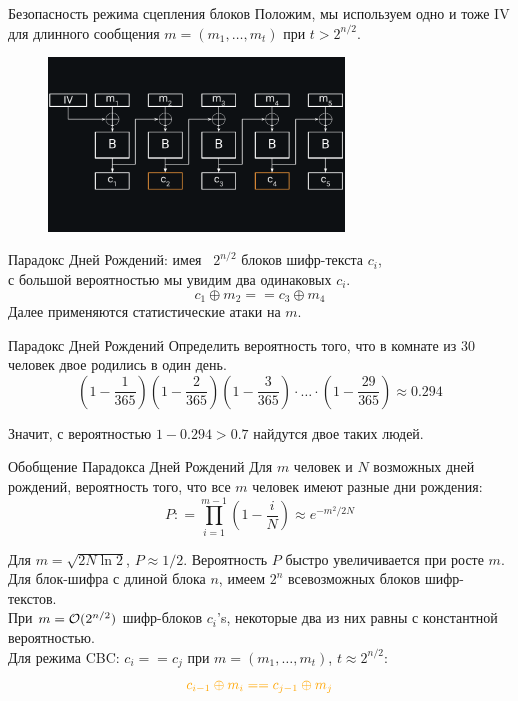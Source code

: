 \documentclass[usenames,dvipsnames,8pt,aspectratio=169]{beamer}
\begin{document}
\begin{frame}{Безопасность режима сцепления блоков}
\Large
Положим, мы используем одно и тоже IV для длинного сообщения $m=(m_1, \ldots, m_t)$ при $t> 2^{n/2}$.
\vspace{-2pt}
\begin{figure}
\includegraphics[width=0.7\textwidth]{CBC_1}
\end{figure}
\vspace{-35pt}
{\color{Orange}Парадокс Дней Рождений:} имея ~$2^{n/2}$ блоков шифр-текста $c_i$, \\ с большой вероятностью мы увидим два одинаковых $c_i$.
\Large
\[
c_1 \oplus m_2 == c_3 \oplus m_4
\]
Далее применяются статистические атаки на $m$.
\end{frame}

\begin{frame}{Парадокс Дней Рождений}
\Large
{\color{Orange} Определить вероятность того, что в комнате из 30 человек двое родились в один день.}\\
\pause
\vspace{30pt}
\[
\left(1 - \frac{1}{365}\right)  \left(1 - \frac{2}{365}\right) \left(1 - \frac{3}{365}\right) \cdot \ldots \cdot \left(1 - \frac{29}{365}\right)  \approx 0.294
\]

\vspace{30pt}
Значит, с вероятностью $1-0.294>0.7$ найдутся двое таких людей.

\end{frame}

\begin{frame}{Обобщение Парадокса Дней Рождений}
\Large
Для $m$ человек и $N$ возможных дней рождений, вероятность того, что все $m$ человек имеют разные дни рождения:
\[
P : = \prod_{i=1}^{m-1} \left(  1  -\frac{i}{N} \right) \approx e^{-m^2/2N}
\]

Для $m = \sqrt{2N \ln 2}$, $P \approx 1/2$.  Вероятность $P$ быстро увеличивается при росте $m$. \\[10pt]

\pause
Для блок-шифра с длиной блока $n$, имеем $2^{n}$ всевозможных блоков шифр-текстов.\\
При {\color{Orange} $m = \mathcal{O}(2^{n/2})$ } шифр-блоков $c_i$'s, некоторые два из них равны с константной вероятностью.\\[15pt]

Для режима CBC: $c_i == c_j$ при $m=(m_1, \ldots, m_t)$, {\color{Orange} $t \approx 2^{n/2}$}:
\Large
\[
{\color{Orange} c_{i-1} \oplus m_{i} == c_{j-1} \oplus m_{j}}
\]

\end{frame}
\end{document}

